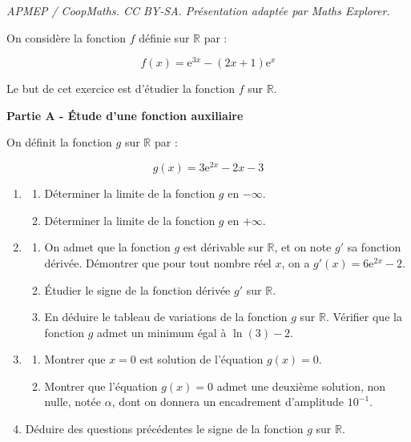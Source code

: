 \documentclass[10pt]{article}
\providecommand{\R}{\mathbb{R}}
\begin{document}
\noindent\textit{APMEP / CoopMaths. CC BY-SA. Présentation adaptée par Maths Explorer.}\par\medskip
\medskip

On considère la fonction $f$ définie sur $\R$ par :

\[f(x)=\mathrm{e}^{3 x}-(2 x+1) \mathrm{e}^{x}\]

Le but de cet exercice est d'étudier la fonction $f$ sur $\mathbb{R}$.

\medskip

\textbf{Partie A - Étude d'une fonction auxiliaire}

\medskip

On définit la fonction $g$ sur $\mathbb{R}$ par :

\[g(x)=3 \mathrm{e}^{2 x}- 2 x - 3\]

\begin{enumerate}
\item 
	\begin{enumerate}
		\item Déterminer la limite de la fonction $g$ en $-\infty$.
		\item Déterminer la limite de la fonction $g$ en $+\infty$.
	\end{enumerate}
\item 
	\begin{enumerate}
		\item On admet que la fonction $g$ est dérivable sur $\mathbb{R}$, et on note $g'$ sa fonction dérivée. Démontrer que pour tout nombre réel $x$, on a $g'(x)=6 \mathrm{e}^{2 x}-2$.
		\item Étudier le signe de la fonction dérivée $g'$ sur $\mathbb{R}$.
		\item En déduire le tableau de variations de la fonction $g$ sur $\mathbb{R}$. Vérifier que la fonction $g$ admet un minimum égal à $\ln (3) - 2$.
	\end{enumerate}
\item 
	\begin{enumerate}
		\item Montrer que $x=0$ est solution de l'équation $g(x) = 0$.
		\item Montrer que l'équation $g(x)=0$ admet une deuxième solution, non nulle, notée $\alpha$, dont on donnera un encadrement d'amplitude $10^{-1}$.
	\end{enumerate}
\item Déduire des questions précédentes le signe de la fonction $g$ sur $\mathbb{R}$.
	\end{enumerate}
\end{document}
